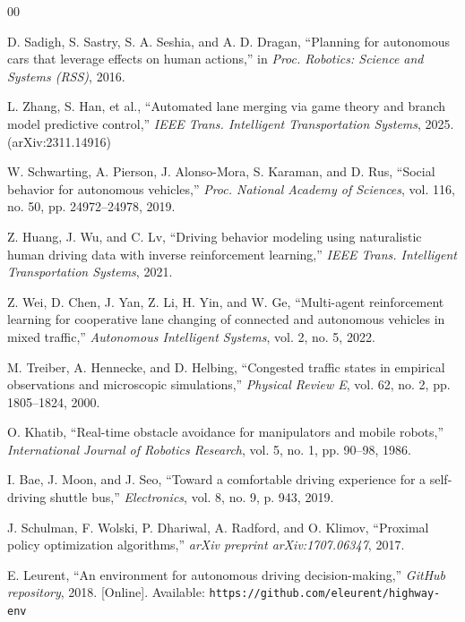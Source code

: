 \documentclass[conference]{IEEEtran}
\begin{document}
\begin{thebibliography}{00}

D. Sadigh, S. Sastry, S. A. Seshia, and A. D. Dragan,
``Planning for autonomous cars that leverage effects on human actions,''
in \textit{Proc. Robotics: Science and Systems (RSS)}, 2016.

L. Zhang, S. Han, et al.,
``Automated lane merging via game theory and branch model predictive control,''
\textit{IEEE Trans. Intelligent Transportation Systems}, 2025.
(arXiv:2311.14916)

W. Schwarting, A. Pierson, J. Alonso-Mora, S. Karaman, and D. Rus,
``Social behavior for autonomous vehicles,''
\textit{Proc. National Academy of Sciences}, vol. 116, no. 50,
pp. 24972--24978, 2019.

Z. Huang, J. Wu, and C. Lv,
``Driving behavior modeling using naturalistic human driving data with
inverse reinforcement learning,''
\textit{IEEE Trans. Intelligent Transportation Systems}, 2021.

Z. Wei, D. Chen, J. Yan, Z. Li, H. Yin, and W. Ge,
``Multi-agent reinforcement learning for cooperative lane changing
of connected and autonomous vehicles in mixed traffic,''
\textit{Autonomous Intelligent Systems}, vol. 2, no. 5, 2022.

M. Treiber, A. Hennecke, and D. Helbing,
``Congested traffic states in empirical observations and microscopic
simulations,''
\textit{Physical Review E}, vol. 62, no. 2, pp. 1805--1824, 2000.

O. Khatib,
``Real-time obstacle avoidance for manipulators and mobile robots,''
\textit{International Journal of Robotics Research}, vol. 5, no. 1,
pp. 90--98, 1986.

I. Bae, J. Moon, and J. Seo,
``Toward a comfortable driving experience for a self-driving shuttle bus,''
\textit{Electronics}, vol. 8, no. 9, p. 943, 2019.

J. Schulman, F. Wolski, P. Dhariwal, A. Radford, and O. Klimov,
``Proximal policy optimization algorithms,''
\textit{arXiv preprint arXiv:1707.06347}, 2017.

E. Leurent,
``An environment for autonomous driving decision-making,''
\textit{GitHub repository}, 2018.
[Online]. Available: \texttt{https://github.com/eleurent/highway-env}

\end{thebibliography}
\end{document}
